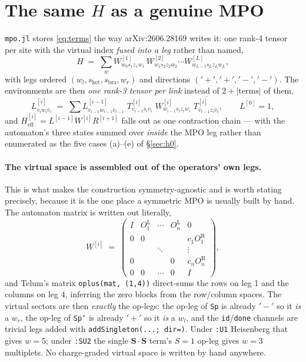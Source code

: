 \documentclass[11pt,a4paper]{article}
\newcommand{\code}[1]{\texttt{\small #1}}
\begin{document}
\section{The same $H$ as a genuine MPO}
\label{sec:mpo}

\code{mpo.jl} stores \eqref{eq:terms} the way arXiv:2606.28169 writes it: one rank-4 tensor per
site with the virtual index \emph{fused into a leg} rather than named,
\begin{equation}
  H \;=\; \sum_{w} W^{[1]}_{w_0 s_1 z_1 w_1}\,W^{[2]}_{w_1 s_2 z_2 w_2}\cdots
                    W^{[L]}_{w_{L-1} s_L z_L w_L},
  \label{eq:mpo}
\end{equation}
with legs ordered $(w_l, s_{\mathrm{ket}}, s_{\mathrm{bra}}, w_r)$ and directions
$('+','+','-','-')$. The environments are then \emph{one rank-3 tensor per link} instead of
$2+|\text{terms}|$ of them,
\begin{equation}
  L^{[i]}_{v_i w_i \bar v_i} \;=\;
  \sum L^{[i-1]}_{v_{i-1} w_{i-1} \bar v_{i-1}}\; T^{[i]}_{v_{i-1} s_i v_i}\;
       W^{[i]}_{w_{i-1} s_i z_i w_i}\; \overline{T^{[i]}_{\bar v_{i-1} z_i \bar v_i}},
  \qquad L^{[0]} = 1,
  \label{eq:mpoenv}
\end{equation}
and $H^{[i]}_{\mathrm{eff}} = L^{[i-1]} W^{[i]} R^{[i+1]}$ falls out as one contraction chain
--- with the automaton's three states summed over \emph{inside} the MPO leg rather than
enumerated as the five cases (a)--(e) of \S\ref{sec:h0}.

\paragraph{The virtual space is assembled out of the operators' own legs.} This is what makes
the construction symmetry-agnostic and is worth stating precisely, because it is the one place a
symmetric MPO is usually built by hand. The automaton matrix is written out literally,
\[
  W^{[i]} \;=\;
  \begin{pmatrix}
    I & O_1^{\mathrm{L}} & \cdots & O_n^{\mathrm{L}} & 0\\
    0 & 0 & & & c_1 O_1^{\mathrm{R}}\\
      & & \ddots & & \vdots\\
    0 & & & 0 & c_n O_n^{\mathrm{R}}\\
    0 & 0 & \cdots & 0 & I
  \end{pmatrix},
\]
and Telum's matrix \code{oplus(mat, (1,4))} direct-sums the rows on leg 1 and the columns on
leg 4, inferring the zero blocks from the row/column spaces. The virtual sectors are then
\emph{exactly} the op-legs: the op-leg of \code{Sp} is already $'-'$ so it \emph{is} a $w_r$,
the op-leg of \code{Sp'} is already $'+'$ so it \emph{is} a $w_l$, and the \code{id}/\code{done}
channels are trivial legs added with \code{addSingleton(...; dir=)}. Under \code{:U1} Heisenberg
that gives $w=5$; under \code{:SU2} the single $\mathbf{S}\cdot\mathbf{S}$ term's $S=1$ op-leg
gives $w=3$ multiplets. No charge-graded virtual space is written by hand anywhere.
\end{document}

